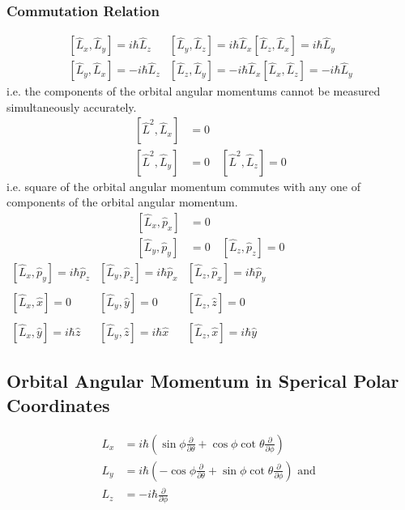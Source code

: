 \subsubsection{Commutation Relation}
\begin{align*}
{\left[\hat{L}_{x}, \hat{L}_{y}\right]=i \hbar \hat{L}_{z}} & {\left[\hat{L}_{y}, \hat{L}_{z}\right]=i \hbar \hat{L}_{x}} {\left[\hat{L}_{z}, \hat{L}_{x}\right]=i \hbar \hat{L}_{y}} \\
{\left[\hat{L}_{y}, \hat{L}_{x}\right]=-i \hbar \hat{L}_{z}} & {\left[\hat{L}_{z}, \hat{L}_{y}\right]=-i \hbar \hat{L}_{x}}  {\left[\hat{L}_{x}, \hat{L}_{z}\right]=-i \hbar \hat{L}_{y}}
\end{align*}
i.e. the components of the orbital angular momentums cannot be measured simultaneously accurately.
\begin{align*}
\left[\hat{L}^{2}, \hat{L}_{x}\right]&=0\\
\left[\hat{L}^{2}, \hat{L}_{y}\right]&=0 \quad\left[\hat{L}^{2}, \hat{L}_{z}\right]=0
\end{align*}
i.e. square of the orbital angular momentum commutes with any one of components of the orbital angular momentum.
\begin{align*}
\left[\hat{L}_{x}, \hat{p}_{x}\right]&=0\\
\left[\hat{L}_{y}, \hat{p}_{y}\right]&=0 \quad\left[\hat{L}_{z}, \hat{p}_{z}\right]=0
\end{align*}
$\begin{array}{lll}
	{\left[\hat{L}_{x}, \hat{p}_{y}\right]=i \hbar \hat{p}_{z}}  & {\left[\hat{L}_{y}, \hat{p}_{z}\right]=i \hbar \hat{p}_{x}} & {\left[\hat{L}_{z}, \hat{p}_{x}\right]=i \hbar \hat{p}_{y}} \\\\
	{\left[\hat{L}_{x}, \hat{x}\right]=0} & {\left[\hat{L}_{y}, \hat{y}\right]=0} & {\left[\hat{L}_{z}, \hat{z}\right]=0} \\\\
	{\left[\hat{L}_{x}, \hat{y}\right]=i \hbar \hat{z}} & {\left[\hat{L}_{y}, \hat{z}\right]=i \hbar \hat{x}} & {\left[\hat{L}_{z}, \hat{x}\right]=i \hbar \hat{y}}
\end{array}$
\subsection{Orbital Angular Momentum in Sperical Polar Coordinates }
\begin{align*}
L_{x}&=i\hbar\left(\sin \phi \frac{\partial}{\partial \theta}+\cos \phi \cot \theta \frac{\partial}{\partial \phi}\right) \\
L_{y}&=i \hbar\left(-\cos \phi \frac{\partial}{\partial \theta}+\sin \phi \cot \theta \frac{\partial}{\partial \phi}\right) \text { and }\\
L_{z}&=-i \hbar \frac{\partial}{\partial \phi}
\end{align*}
